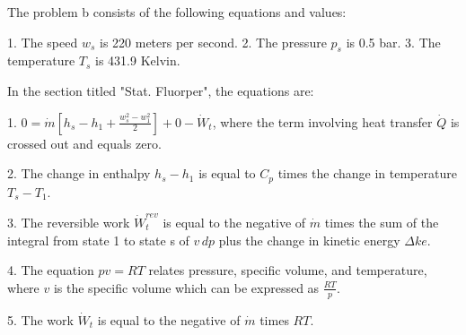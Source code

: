 The problem b consists of the following equations and values:

1. The speed \( w_s \) is 220 meters per second.
2. The pressure \( p_s \) is 0.5 bar.
3. The temperature \( T_s \) is 431.9 Kelvin.

In the section titled "Stat. Fluorper", the equations are:

1. \( 0 = \dot{m} \left[ h_s - h_1 + \frac{w_s^2 - w_1^2}{2} \right] + 0 - \dot{W}_t \), where the term involving heat transfer \( \dot{Q} \) is crossed out and equals zero.

2. The change in enthalpy \( h_s - h_1 \) is equal to \( C_p \) times the change in temperature \( T_s - T_1 \).

3. The reversible work \( \dot{W}_t^{rev} \) is equal to the negative of \( \dot{m} \) times the sum of the integral from state 1 to state s of \( v \, dp \) plus the change in kinetic energy \( \Delta ke \).

4. The equation \( pv = RT \) relates pressure, specific volume, and temperature, where \( v \) is the specific volume which can be expressed as \( \frac{RT}{p} \).

5. The work \( \dot{W}_t \) is equal to the negative of \( \dot{m} \) times \( RT \).